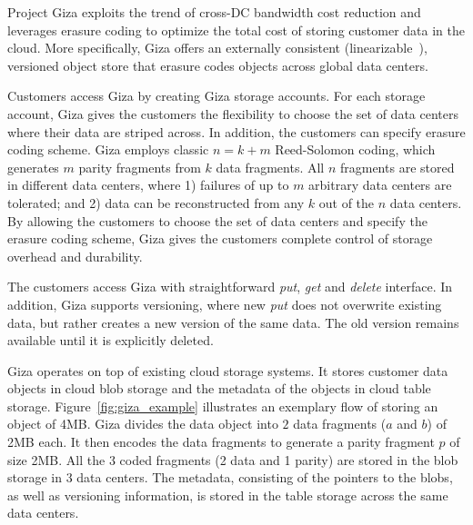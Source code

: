 Project Giza exploits the trend of cross-DC bandwidth cost reduction
and leverages erasure coding to optimize the total cost of storing customer data in the cloud.
More specifically,
Giza offers an externally consistent (linearizable~\cite{herlihy90linearizability}),
versioned object store that erasure codes objects across global data centers.

Customers access Giza by creating Giza storage accounts. For each storage
account, Giza gives the customers the flexibility to choose the set of data centers
where their data are striped across.
In addition, the customers can specify erasure coding scheme. Giza employs classic $n = k + m$
Reed-Solomon coding, which generates $m$ parity fragments from $k$ data
fragments. All $n$ fragments are stored in different data centers, where 1)
failures of up to $m$ arbitrary data centers are tolerated; and 2) data can be
reconstructed from any $k$ out of the $n$ data centers. By allowing the
customers to choose the set of data centers and specify the erasure coding scheme,
Giza gives the customers complete control of storage overhead and durability.

The customers access Giza with straightforward {\em put}, {\em get} and {\em delete} interface. In addition, Giza supports versioning, where new {\em put} does not overwrite existing data, but rather creates a new version of the same data. The old version remains available until it is explicitly deleted.

Giza operates on top of existing cloud storage systems. It stores customer data
objects in cloud blob storage and the metadata of the objects in cloud table
storage. Figure~\ref{fig:giza_example} illustrates an exemplary flow of storing
an object of 4MB.
Giza divides the data object into $2$ data fragments ($a$ and $b$) of 2MB each.
It then encodes the data fragments to generate a parity fragment $p$ of size
2MB. All the $3$ coded fragments (2 data and 1 parity) are stored in the blob
storage in 3 data centers. The metadata, consisting of the pointers to the
blobs, as well as versioning information, is stored in the table storage across the
same data centers.

